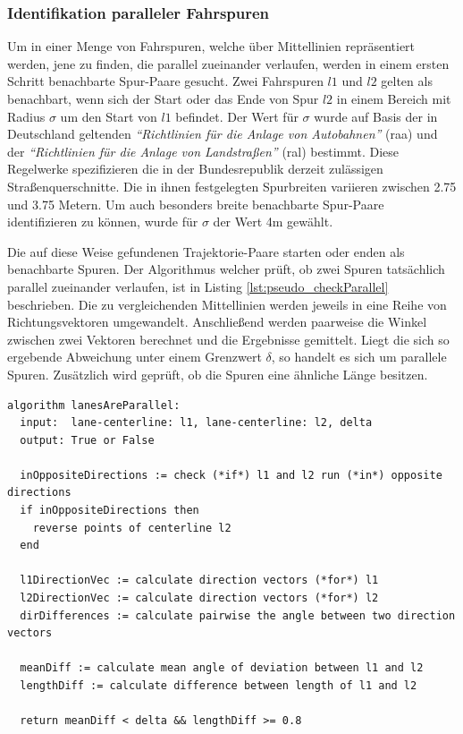 \subsubsection{Identifikation paralleler Fahrspuren}
\label{sec:real2_identify_parallel_lanes}

Um in einer Menge von Fahrspuren, welche über Mittellinien repräsentiert werden, jene zu finden, die
parallel zueinander verlaufen, werden in einem ersten Schritt benachbarte Spur-Paare gesucht.
Zwei Fahrspuren $l1$ und $l2$ gelten als benachbart, wenn sich der Start oder das Ende
von Spur $l2$ in einem Bereich mit Radius $\sigma$ um den Start von $l1$ befindet.
Der Wert für $\sigma$ wurde auf Basis der in Deutschland geltenden
\textit{``Richtlinien für die Anlage von Autobahnen''} (\acrshort*{raa}) \cite[]{RAA2008}
und der \textit{``Richtlinien für die Anlage von Landstraßen''} (\acrshort*{ral}) \cite[]{RAL2012} bestimmt.
Diese Regelwerke spezifizieren die in der Bundesrepublik derzeit zulässigen Straßenquerschnitte.
Die in ihnen festgelegten Spurbreiten variieren zwischen 2.75 und 3.75 Metern.
Um auch besonders breite benachbarte Spur-Paare identifizieren zu können, wurde für $\sigma$ der Wert 4m gewählt.

Die auf diese Weise gefundenen Trajektorie-Paare starten oder enden als benachbarte Spuren.
Der Algorithmus welcher prüft, ob zwei Spuren tatsächlich parallel zueinander verlaufen, ist in Listing
\ref{lst:pseudo_checkParallel} beschrieben. Die zu vergleichenden Mittellinien werden jeweils in eine
Reihe von Richtungsvektoren umgewandelt. Anschließend werden paarweise die Winkel zwischen zwei Vektoren
berechnet und die Ergebnisse gemittelt.
Liegt die sich so ergebende Abweichung unter einem Grenzwert $\delta$, so handelt es sich um parallele Spuren.
Zusätzlich wird geprüft, ob die Spuren eine ähnliche Länge besitzen.
\begin{lstlisting}[caption=Pseudocode Überprüfung der Parallelität zweier Mittellinien, language=Pseudo, label=lst:pseudo_checkParallel]
algorithm lanesAreParallel:
  input:  lane-centerline: l1, lane-centerline: l2, delta
  output: True or False

  inOppositeDirections := check (*if*) l1 and l2 run (*in*) opposite directions
  if inOppositeDirections then
    reverse points of centerline l2
  end

  l1DirectionVec := calculate direction vectors (*for*) l1
  l2DirectionVec := calculate direction vectors (*for*) l2
  dirDifferences := calculate pairwise the angle between two direction vectors

  meanDiff := calculate mean angle of deviation between l1 and l2
  lengthDiff := calculate difference between length of l1 and l2

  return meanDiff < delta && lengthDiff >= 0.8
\end{lstlisting}

